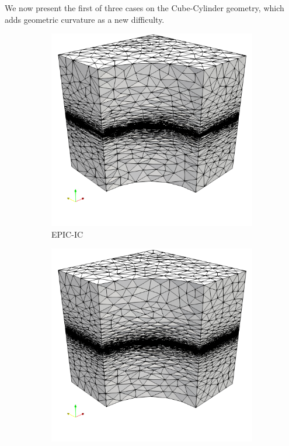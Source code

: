 \documentclass[3p,times,procedia,number]{elsarticle}
\begin{document}
We now present the first of three cases on the Cube-Cylinder geometry,
which adds geometric curvature as a new difficulty.

\begin{figure}
\begin{subfigure}{.24\textwidth}
\centering
\includegraphics[width=\textwidth]{epic-ic-cube-cylinder-linear.png}
\caption{EPIC-IC}
\end{subfigure}
\begin{subfigure}{.24\textwidth}
\centering
\includegraphics[width=\textwidth]{epic-ics-cube-cylinder-linear.png}

\end{subfigure}
\end{figure}
\end{document}
